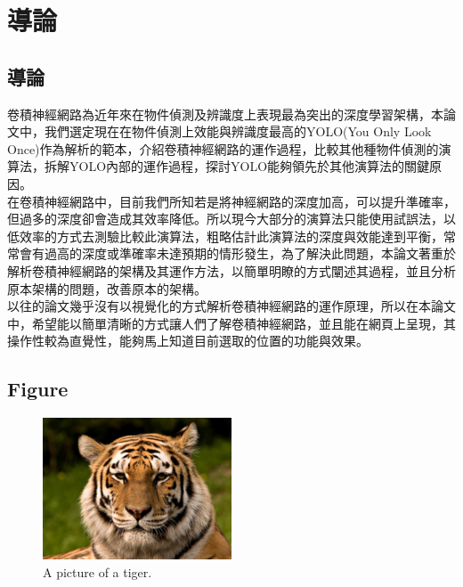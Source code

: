\chapter{導論}
\label{c:1}

\section{導論}
卷積神經網路為近年來在物件偵測及辨識度上表現最為突出的深度學習架構，本論文中，我們選定現在在物件偵測上效能與辨識度最高的YOLO(You Only Look Once)作為解析的範本，介紹卷積神經網路的運作過程，比較其他種物件偵測的演算法，拆解YOLO內部的運作過程，探討YOLO能夠領先於其他演算法的關鍵原因。\\
在卷積神經網路中，目前我們所知若是將神經網路的深度加高，可以提升準確率，但過多的深度卻會造成其效率降低。所以現今大部分的演算法只能使用試誤法，以低效率的方式去測驗比較此演算法，粗略估計此演算法的深度與效能達到平衡，常常會有過高的深度或準確率未達預期的情形發生，為了解決此問題，本論文著重於解析卷積神經網路的架構及其運作方法，以簡單明瞭的方式闡述其過程，並且分析原本架構的問題，改善原本的架構。\\
以往的論文幾乎沒有以視覺化的方式解析卷積神經網路的運作原理，所以在本論文中，希望能以簡單清晰的方式讓人們了解卷積神經網路，並且能在網頁上呈現，其操作性較為直覺性，能夠馬上知道目前選取的位置的功能與效果。

\section{Figure}
\label{ss:Figure}
\begin{figure}[htpb!]
  \centering
    \includegraphics[width=0.5\textwidth]{fig/tiger.jpeg}
    \caption{\label{fig:tiger}A picture of a tiger.}
\end{figure}

